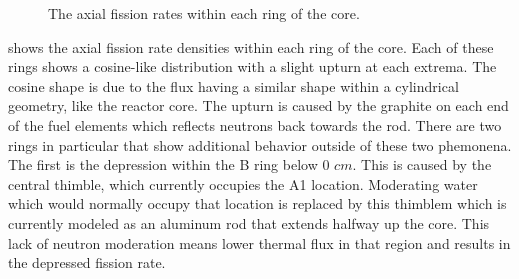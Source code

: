 \begin{figure}[htb]
\caption[Axial Fission Rates]{The axial fission rates within each ring of the core.}
\label{fig:axial_rr_density}
\end{figure}


 shows the axial fission rate densities within each ring of the core.
Each of these rings shows a cosine-like distribution with a slight upturn at each extrema.
The cosine shape is due to the flux having a similar shape within a cylindrical geometry, like the reactor core.
The upturn is caused by the graphite on each end of the fuel elements which reflects neutrons back towards the rod.
There are two rings in particular that show additional behavior outside of these two phemonena.
The first is the depression within the B ring below 0 $cm$.
This is caused by the central thimble, which currently occupies the A1 location.
Moderating water which would normally occupy that location is replaced by this thimblem which is currently modeled as an aluminum rod that extends halfway up the core.
This lack of neutron moderation means lower thermal flux in that region and results in the depressed fission rate.

